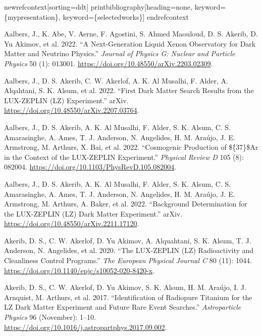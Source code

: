\documentclass[
  10pt,
  letterpaper,
  DIV=11,
  numbers=noendperiod]{scrartcl}
\newlength{\cslhangindent}
\newlength{\cslentryspacingunit} %
\newenvironment{CSLReferences}[2] %
 {%
  \setlength{\parindent}{0pt}
  \ifodd #1
  \let\oldpar\par
  \def\par{\hangindent=\cslhangindent\oldpar}
  \fi
  \setlength{\parskip}{#2\cslentryspacingunit}
 }%
 {}
\begin{document}
newrefcontext{[}sorting=ddt{]} printbibliography{[}heading=none,
keyword=\{mypresentation\}, keyword=\{selectedworks\}{]} endrefcontext

\hypertarget{refs}{}
\begin{CSLReferences}{1}{0}
\leavevmode{}%
Aalbers, J., K. Abe, V. Aerne, F. Agostini, S. Ahmed Maouloud, D. S.
Akerib, D. Yu Akimov, et al. 2022. {``A {Next-Generation Liquid Xenon
Observatory} for {Dark Matter} and {Neutrino Physics}.''} \emph{Journal
of Physics G: Nuclear and Particle Physics} 50 (1): 013001.
\url{https://doi.org/10.48550/arXiv.2203.02309}.

\leavevmode{}%
Aalbers, J., D. S. Akerib, C. W. Akerlof, A. K. Al Musalhi, F. Alder, A.
Alqahtani, S. K. Alsum, et al. 2022. {``First {Dark Matter Search
Results} from the {LUX-ZEPLIN} ({LZ}) {Experiment}.''} {arXiv}.
\url{https://doi.org/10.48550/arXiv.2207.03764}.

\leavevmode{}%
Aalbers, J., D. S. Akerib, A. K. Al Musalhi, F. Alder, S. K. Alsum, C.
S. Amarasinghe, A. Ames, T. J. Anderson, N. Angelides, H. M. Araújo, J.
E. Armstrong, M. Arthurs, X. Bai, et al. 2022. {``Cosmogenic Production
of \$\{̂37\}\${Ar} in the Context of the {LUX-ZEPLIN} Experiment.''}
\emph{Physical Review D} 105 (8): 082004.
\url{https://doi.org/10.1103/PhysRevD.105.082004}.

\leavevmode{}%
Aalbers, J., D. S. Akerib, A. K. Al Musalhi, F. Alder, S. K. Alsum, C.
S. Amarasinghe, A. Ames, T. J. Anderson, N. Angelides, H. M. Araújo, J.
E. Armstrong, M. Arthurs, A. Baker, et al. 2022. {``Background
{Determination} for the {LUX-ZEPLIN} ({LZ}) {Dark Matter Experiment}.''}
{arXiv}. \url{https://doi.org/10.48550/arXiv.2211.17120}.

\leavevmode{}%
Akerib, D. S., C. W. Akerlof, D. Yu Akimov, A. Alquahtani, S. K. Alsum,
T. J. Anderson, N. Angelides, et al. 2020. {``The {LUX-ZEPLIN} ({LZ})
Radioactivity and Cleanliness Control Programs.''} \emph{The European
Physical Journal C} 80 (11): 1044.
\url{https://doi.org/10.1140/epjc/s10052-020-8420-x}.

\leavevmode{}%
Akerib, D. S., C. W. Akerlof, D. Yu Akimov, S. K. Alsum, H. M. Araújo,
I. J. Arnquist, M. Arthurs, et al. 2017. {``Identification of {Radiopure
Titanium} for the {LZ Dark Matter Experiment} and {Future Rare Event
Searches}.''} \emph{Astroparticle Physics} 96 (November): 1--10.
\url{https://doi.org/10.1016/j.astropartphys.2017.09.002}.


\end{CSLReferences}
\end{document}
